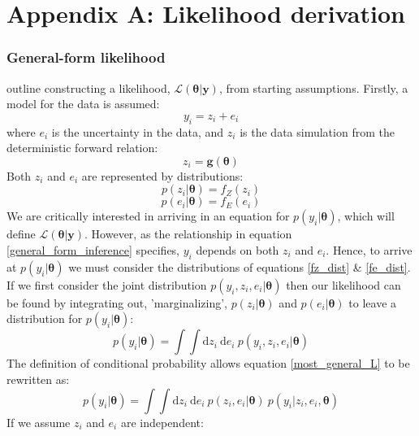 \chapter{Appendix A: Likelihood derivation}
\label{AppendixA}

\subsection{General-form likelihood}
\citet[p.90-92]{gregory2005bayesian} outline constructing a likelihood, $\mathcal{L}(\bm{\theta}|\bm{y})$, from starting assumptions. Firstly, a model for the data is assumed:
\begin{equation}
y_i = z_i + e_i
\label{general_form_inference}
\end{equation}
where $e_i$ is the uncertainty in the data, and $z_i$ is the data simulation from the deterministic forward relation:
\begin{equation}
z_i = \bm{g}(\bm{\theta})
\end{equation}
Both $z_i$ and $e_i$ are represented by distributions:
\begin{equation}
p(z_i|\bm{\theta}) = f_Z(z_i)
\label{fz_dist}
\end{equation}
\begin{equation}
p(e_i|\bm{\theta}) = f_E(e_i)
\label{fe_dist}
\end{equation}
We are critically interested in arriving in an equation for $p(y_i|\bm{\theta})$, which will define $\mathcal{L}(\bm{\theta}|\bm{y})$. However, as the relationship in equation \ref{general_form_inference} specifies, $y_i$ depends on both $z_i$ and $e_i$. Hence, to arrive at $p(y_i|\bm{\theta})$ we must consider the distributions of equations \ref{fz_dist} \& \ref{fe_dist}. If we first consider the joint distribution $p(y_i,z_i,e_i|\bm{\theta})$ then our likelihood can be found by integrating out, 'marginalizing', $p(z_i|\bm{\theta})$ and $p(e_i|\bm{\theta})$ to leave a distribution for $p(y_i|\bm{\theta})$:
\begin{equation}
p(y_i|\bm{\theta}) = \int \int \text{d}z_i\ \text{d}e_i\ p(y_i,z_i,e_i|\bm{\theta})
\label{most_general_L}
\end{equation}
The definition of conditional probability allows equation \ref{most_general_L} to be rewritten as:
\begin{equation}
p(y_i|\bm{\theta}) = \int \int \text{d}z_i\ \text{d}e_i\ p(z_i,e_i|\bm{\theta})\ p(y_i|z_i,e_i,\bm{\theta})
\end{equation}
If we assume $z_i$ and $e_i$ are independent:
